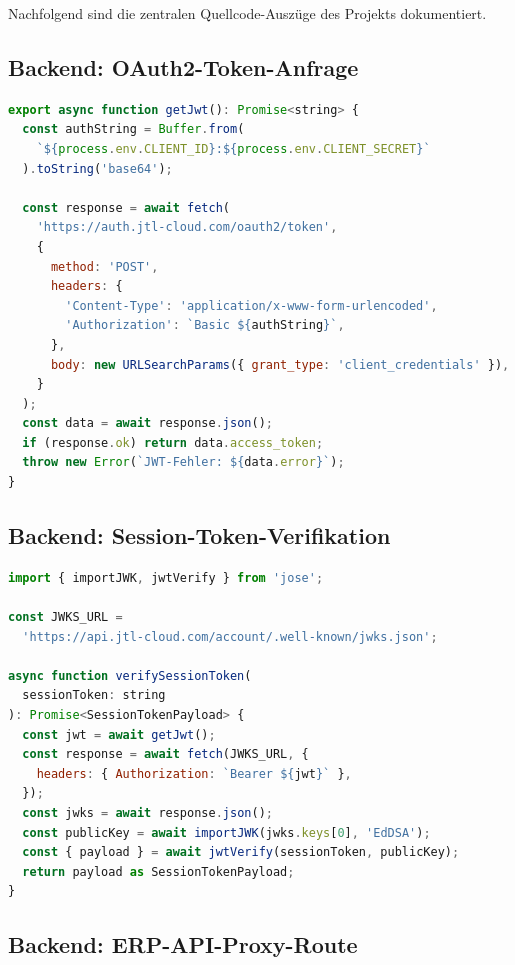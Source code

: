 \documentclass[11pt, a4paper, oneside]{report}
\begin{document}
Nachfolgend sind die zentralen Quellcode-Auszüge des Projekts dokumentiert.

\subsection{Backend: OAuth2-Token-Anfrage}

\begin{lstlisting}[language=JavaScript, caption={OAuth2-Token-Anfrage mit Basic Auth (index.ts)}, label=lst:oauth]
export async function getJwt(): Promise<string> {
  const authString = Buffer.from(
    `${process.env.CLIENT_ID}:${process.env.CLIENT_SECRET}`
  ).toString('base64');

  const response = await fetch(
    'https://auth.jtl-cloud.com/oauth2/token',
    {
      method: 'POST',
      headers: {
        'Content-Type': 'application/x-www-form-urlencoded',
        'Authorization': `Basic ${authString}`,
      },
      body: new URLSearchParams({ grant_type: 'client_credentials' }),
    }
  );
  const data = await response.json();
  if (response.ok) return data.access_token;
  throw new Error(`JWT-Fehler: ${data.error}`);
}
\end{lstlisting}

\subsection{Backend: Session-Token-Verifikation}

\begin{lstlisting}[language=JavaScript, caption={Session-Token-Verifikation mit JWKS (index.ts)}, label=lst:tokenmanager]
import { importJWK, jwtVerify } from 'jose';

const JWKS_URL =
  'https://api.jtl-cloud.com/account/.well-known/jwks.json';

async function verifySessionToken(
  sessionToken: string
): Promise<SessionTokenPayload> {
  const jwt = await getJwt();
  const response = await fetch(JWKS_URL, {
    headers: { Authorization: `Bearer ${jwt}` },
  });
  const jwks = await response.json();
  const publicKey = await importJWK(jwks.keys[0], 'EdDSA');
  const { payload } = await jwtVerify(sessionToken, publicKey);
  return payload as SessionTokenPayload;
}
\end{lstlisting}

\subsection{Backend: ERP-API-Proxy-Route}
\end{document}
